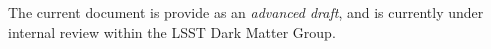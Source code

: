 The current document is provide as an \emph{advanced draft}, and is currently under internal review within the LSST Dark Matter Group.




